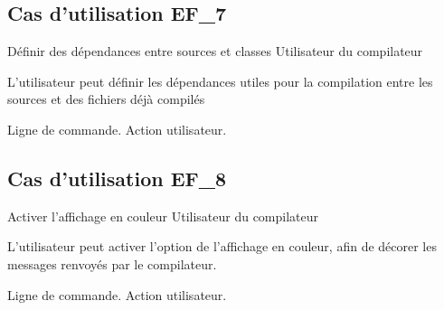 \subsection{Cas d'utilisation EF\_7}
\fiche
{Définir des dépendances entre sources et classes}          %
{Utilisateur du compilateur}                               %
{                                                %
   
L'utilisateur peut définir les dépendances utiles pour la compilation entre les sources et des fichiers déjà compilés    
}
{
  
}                                                %
{Ligne de commande.}                             %
{Action utilisateur.}                       %
{                                                %
 
}{} %
{} %

\subsection{Cas d'utilisation EF\_8}
\fiche
{Activer l'affichage en couleur}          %
{Utilisateur du compilateur}                               %
{                                                %
   
L'utilisateur peut activer l'option de l'affichage en couleur, afin de décorer les messages renvoyés par le compilateur.   
}
{
  
}                                                %
{Ligne de commande.}                             %
{Action utilisateur.}                       %
{                                                %
 
}{} %
{} %
